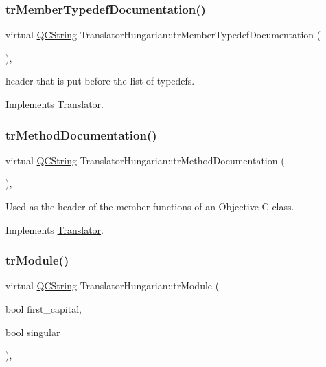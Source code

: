 \subsubsection{\texorpdfstring{trMemberTypedefDocumentation()}{trMemberTypedefDocumentation()}}
{\footnotesize\ttfamily virtual \mbox{\hyperlink{class_q_c_string}{Q\+C\+String}} Translator\+Hungarian\+::tr\+Member\+Typedef\+Documentation (\begin{DoxyParamCaption}{ }\end{DoxyParamCaption})\hspace{0.3cm}{\ttfamily [inline]}, {\ttfamily [virtual]}}

header that is put before the list of typedefs. 

Implements \mbox{\hyperlink{class_translator}{Translator}}.

\mbox{\label{class_translator_hungarian_a255db686dca6f89cd4405d3ddfafa195}} 
\subsubsection{\texorpdfstring{trMethodDocumentation()}{trMethodDocumentation()}}
{\footnotesize\ttfamily virtual \mbox{\hyperlink{class_q_c_string}{Q\+C\+String}} Translator\+Hungarian\+::tr\+Method\+Documentation (\begin{DoxyParamCaption}{ }\end{DoxyParamCaption})\hspace{0.3cm}{\ttfamily [inline]}, {\ttfamily [virtual]}}

Used as the header of the member functions of an Objective-\/C class. 

Implements \mbox{\hyperlink{class_translator}{Translator}}.

\mbox{\label{class_translator_hungarian_ad24ea03285311ac4041ba271010f4a3f}} 
\subsubsection{\texorpdfstring{trModule()}{trModule()}}
{\footnotesize\ttfamily virtual \mbox{\hyperlink{class_q_c_string}{Q\+C\+String}} Translator\+Hungarian\+::tr\+Module (\begin{DoxyParamCaption}\item[{bool}]{first\+\_\+capital,  }\item[{bool}]{singular }\end{DoxyParamCaption})\hspace{0.3cm}{\ttfamily [inline]}, {\ttfamily [virtual]}}

